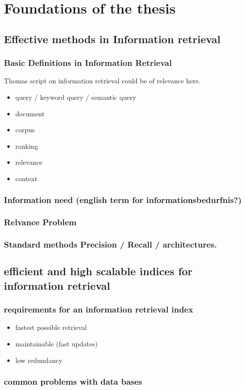 \documentclass[•]{book}
\begin{document}
\chapter{Foundations of the thesis}
\section{Effective methods in Information retrieval}
\subsection{Basic Definitions in Information Retrieval}
Thomas script on information retrieval could be of relevance here.
\begin{itemize}
\item query / keyword query / semantic query
\item document
\item corpus
\item ranking
\item relevance
\item context
\end{itemize}
\subsection{Information need (english term for informationsbedurfnis?)}
\subsection{Relvance Problem}
\subsection{Standard methods Precision / Recall / architectures.}
\section{efficient and high scalable indices for information retrieval}
\subsection{requirements for an information retrieval index}
\begin{itemize}
\item fastest possible retrieval
\item maintainable (fast updates)
\item low redundancy
\end{itemize}
\subsection{common problems with data bases}
\end{document}
